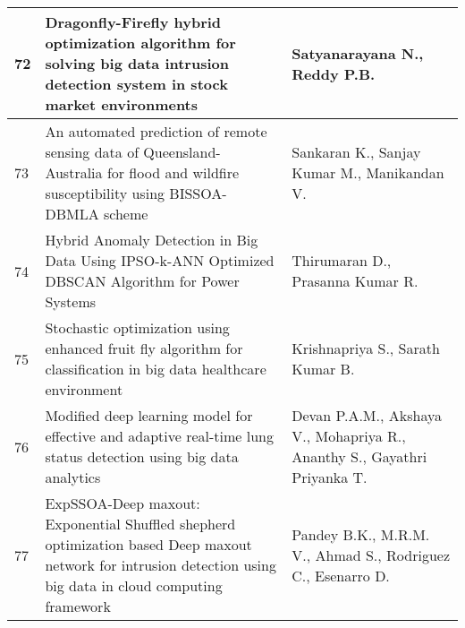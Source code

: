\begin{longtable}{|p{}|p{}|p{}|}
\hline
72 & Dragonfly-Firefly hybrid optimization algorithm for solving big data intrusion detection system in stock market environments & Satyanarayana N., Reddy P.B. \\
\hline
73 & An automated prediction of remote sensing data of Queensland-Australia for flood and wildfire susceptibility using BISSOA-DBMLA scheme & Sankaran K., Sanjay Kumar M., Manikandan V. \\
\hline
74 & Hybrid Anomaly Detection in Big Data Using IPSO-k-ANN Optimized DBSCAN Algorithm for Power Systems & Thirumaran D., Prasanna Kumar R. \\
\hline
75 & Stochastic optimization using enhanced fruit fly algorithm for classification in big data healthcare environment & Krishnapriya S., Sarath Kumar B. \\
\hline
76 & Modified deep learning model for effective and adaptive real-time lung status detection using big data analytics & Devan P.A.M., Akshaya V., Mohapriya R., Ananthy S., Gayathri Priyanka T. \\
\hline
77 & ExpSSOA-Deep maxout: Exponential Shuffled shepherd optimization based Deep maxout network for intrusion detection using big data in cloud computing framework & Pandey B.K., M.R.M. V., Ahmad S., Rodriguez C., Esenarro D. \\
\hline

\end{longtable}
